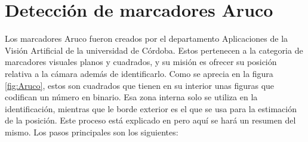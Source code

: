 \section{Detección de marcadores Aruco} \label{sec:detectAruco}
	Los marcadores Aruco fueron creados por el departamento Aplicaciones de la Visión Artificial de la universidad de Córdoba. Estos pertenecen a la categoria de marcadores visuales planos y cuadrados, y su misión es ofrecer su posición relativa a la cámara además de identificarlo. 
	Como se aprecia en la figura \ref{fig:Aruco}, estos son cuadrados que tienen en su interior unas figuras que codifican un número en binario. Esa zona interna solo se utiliza en la identificación, mientras que le borde exterior es el que se usa para la estimación de la posición. Este proceso está explicado en \cite{aruco2014} pero aquí se hará un resumen del mismo. Los pasos principales son los siguientes:
\figAruco
